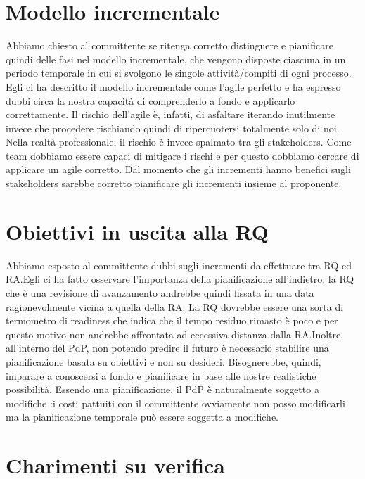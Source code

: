 \documentclass{article}
\begin{document}
\section{Modello incrementale}%
\label{modello_incrementale}

Abbiamo chiesto al committente se ritenga corretto distinguere e pianificare quindi delle fasi nel modello incrementale, che vengono disposte ciascuna in un periodo temporale in cui si svolgono le singole attività/compiti di ogni processo. Egli ci ha descritto il modello incrementale come l'agile perfetto e ha espresso dubbi circa la nostra capacità di comprenderlo a fondo e applicarlo correttamente. Il rischio dell'agile è, infatti, di asfaltare iterando inutilmente invece che procedere rischiando quindi di ripercuotersi totalmente solo di noi. Nella realtà professionale, il rischio è invece spalmato tra gli stakeholders. Come team dobbiamo essere capaci di mitigare i rischi e per questo dobbiamo cercare di applicare un agile corretto. Dal momento che gli incrementi hanno benefici sugli stakeholders sarebbe corretto pianificare gli incrementi insieme al proponente. 

\section{Obiettivi in uscita alla RQ}%
\label{sec:obiettivi_in_uscita_alla_RQ}

Abbiamo esposto al committente dubbi sugli incrementi da effettuare tra RQ ed RA.Egli ci ha fatto osservare l'importanza della pianificazione all'indietro: la RQ che è una revisione di avanzamento andrebbe quindi fissata in una data ragionevolmente vicina a quella della RA. La RQ dovrebbe essere una sorta di termometro di readiness che indica che il tempo residuo rimasto è poco e per questo motivo non andrebbe affrontata ad eccessiva distanza dalla RA.Inoltre, all'interno del PdP, non potendo predire il futuro è necessario stabilire una pianificazione basata su obiettivi e non su desideri. Bisognerebbe, quindi, imparare a conoscersi a fondo e pianificare in base alle nostre realistiche possibilità. Essendo una pianificazione, il PdP è naturalmente soggetto a modifiche :i costi pattuiti con il committente ovviamente non posso modificarli ma la pianificazione temporale può essere soggetta a modifiche.

\section{Charimenti su verifica}%
\label{sec:chiarimenti_su_verifica}
\end{document}
